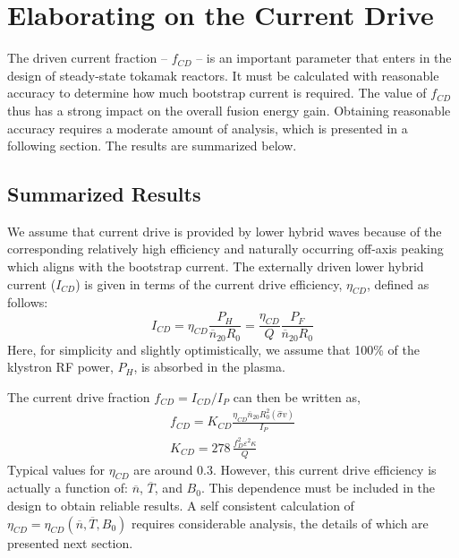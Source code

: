 \chapter{Elaborating on the Current Drive}

\label{chapter:lhcd}

The driven current fraction -- $f_{CD}$ -- is an important parameter that enters in the design of steady-state tokamak reactors. It must be calculated with reasonable accuracy to determine how much bootstrap current is required. The value of $f_{CD}$ thus has a strong impact on the overall fusion energy gain. Obtaining reasonable accuracy requires a moderate amount of analysis, which is presented in a following section. The results are summarized below.

\section{Summarized Results}

We assume that current drive is provided by lower hybrid waves because of the corresponding relatively high efficiency and naturally occurring off-axis peaking which aligns with the bootstrap current. The externally driven lower hybrid current ($I_{CD}$) is given in terms of the current drive efficiency, $\eta_{CD}$, defined as follows:\cite{itercd}
\begin{equation}
	I _ { C D } = \eta _ { C D } \frac { P _ { H } } { \overline { n } _ { 20 } R _ { 0 } } = \frac { \eta _ { C D } } { Q } \frac { P _ { F } } { \overline { n } _ { 20 } R _ { 0 } }
\end{equation}
Here, for simplicity and slightly optimistically, we assume that 100\% of the klystron RF power, $P_H$, is absorbed in the plasma.

The current drive fraction $f_{CD} = I_{CD}/I_P$ can then be written as,
\begin{gather}
	f _ { C D } = K _ { C D } \frac { \eta _ { C D } \overline { n } _ { 20 } R _ { 0 } ^ { 2 } ( \hat { \sigma } v ) } { I _ { P } } \\
	K _ { C D } = 278 \, \frac { f _ { D } ^ { 2 } \varepsilon ^ { 2 } \kappa } { Q }
\end{gather}
Typical values for $\eta_{CD}$ are around 0.3.\cite{itercd} However, this current drive efficiency is actually a function of: $\overline n$, $\overline T$, and $B_0$. This dependence must be included in the design to obtain reliable results. A self consistent calculation of $\eta_{CD} = \eta_{CD}(\overline n, \overline T, B_0)$ requires considerable analysis, the details of which are presented next section.

